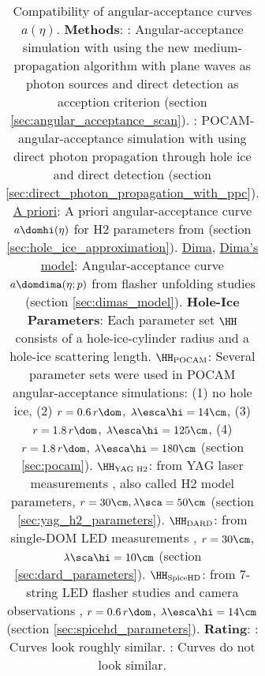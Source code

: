 \begin{table}
\begin{center}
{\begin{tabular}{rr|ccccccc}
  \end{tabular}
  }
  \end{center}
  \caption{Compatibility of angular-acceptance curves $a(\eta)$. \textbf{Methods}: \underline{\clsim}: Angular-acceptance simulation with \clsim using the new medium-propagation algorithm with plane waves as photon sources and direct detection as acception criterion (section \ref{sec:angular_acceptance_scan}). \underline{\ppc}: POCAM-angular-acceptance simulation with \ppc using direct photon propagation through hole ice and direct detection (section \ref{sec:direct_photon_propagation_with_ppc}). \underline{A priori}: A priori angular-acceptance curve $a\domhi(\eta)$ for H2 parameters from \cite{icepaper} (section \ref{sec:hole_ice_approximation}). \underline{Dima}, \underline{Dima's model}: Angular-acceptance curve $a\domdima(\eta;p)$ from flasher unfolding studies \cite{flasherdataderivedicemodels} (section \ref{sec:dimas_model}). \textbf{Hole-Ice Parameters}: Each parameter set $\HH$ consists of a hole-ice-cylinder radius and a hole-ice scattering length. \underline{$\HH_\text{POCAM}$}: Several parameter sets were used in POCAM angular-acceptance simulations: (1) no hole ice, (2) $r = 0.6\,r\dom$, $\lambda\esca\hi=14\cm$, (3) $r = 1.8\,r\dom$, $\lambda\esca\hi = 125\cm$, (4) $r = 1.8\,r\dom$, $\lambda\esca\hi = 180\cm$ (section \ref{sec:pocam}). \underline{$\HH_\text{YAG H2}$}: from YAG laser measurements \cite{holeicestudieswithyag}, also called H2 model parameters, $r = 30\cm, \lambda\sca=50\cm$ (section \ref{sec:yag_h2_parameters}). \underline{$\HH_\text{DARD}$}: from single-DOM LED measurements \cite{martindardupdate}, $r=30\cm$, $\lambda\sca\hi = 10\cm$ (section \ref{sec:dard_parameters}). \underline{$\HH_\text{SpiceHD}$}: from 7-string LED flasher studies \cite{martinspicehddard} and camera observations \cite{rongenswedishcamera}, $r = 0.6\,r\dom$, $\lambda\esca\hi = 14\cm$ (section \ref{sec:spicehd_parameters}). \textbf{Rating}: \ok: Curves look roughly similar. \bad: Curves do not look similar.}
  \label{tab:angular_acceptance_compatibility}
\end{table}


